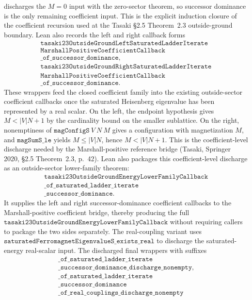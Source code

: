 \documentclass[a4paper,11pt]{article}
\begin{document}
discharges the \(M=0\) input with the zero-sector theorem, so successor
dominance is the only remaining coefficient input.
This is the explicit induction closure of the coefficient recursion used at
the Tasaki §2.5 Theorem~2.3 outside-ground boundary.  Lean also records the
left and right callback forms
\[
\begin{gathered}
\texttt{tasaki23OutsideGroundLeftSaturatedLadderIterate}\\
\texttt{MarshallPositiveCoefficientCallback}\\
\texttt{\_of\_successor\_dominance},\\
\texttt{tasaki23OutsideGroundRightSaturatedLadderIterate}\\
\texttt{MarshallPositiveCoefficientCallback}\\
\texttt{\_of\_successor\_dominance}.
\end{gathered}
\]
These wrappers feed the closed coefficient family into the existing
outside-sector coefficient callbacks once the saturated Heisenberg eigenvalue
has been represented by a real scalar.  On the left, the endpoint hypothesis
gives \(M<|V|N+1\) by the cardinality bound on the smaller sublattice.  On the
right, nonemptiness of \(\texttt{magConfigS}\ V\ N\ M\) gives a configuration
with magnetization \(M\), and \(\texttt{magSumS\_le}\) yields
\(M\le |V|N\), hence \(M<|V|N+1\).  This is the coefficient-level discharge
needed by the Marshall-positive reference bridge (Tasaki, Springer 2020,
§2.5 Theorem~2.3, p.~42).
Lean also packages this coefficient-level discharge as an outside-sector
lower-family theorem:
\[
\begin{gathered}
\texttt{tasaki23OutsideGroundEnergyLowerFamilyCallback}\\
\texttt{\_of\_saturated\_ladder\_iterate}\\
\texttt{\_successor\_dominance}.
\end{gathered}
\]
It supplies the left and right successor-dominance coefficient callbacks to the
Marshall-positive coefficient bridge, thereby producing the full
\(\texttt{tasaki23OutsideGroundEnergyLowerFamilyCallback}\) without requiring
callers to package the two sides separately.  The real-coupling variant uses
\(\texttt{saturatedFerromagnetEigenvalueS\_exists\_real}\) to discharge the
saturated-energy real-scalar input.  The discharged final wrappers with suffixes
\[
\begin{gathered}
\texttt{\_of\_saturated\_ladder\_iterate}\\
\texttt{\_successor\_dominance\_discharge\_nonempty},\\
\texttt{\_of\_saturated\_ladder\_iterate}\\
\texttt{\_successor\_dominance}\\
\texttt{\_of\_real\_couplings\_discharge\_nonempty}
\end{gathered}
\]
\end{document}
